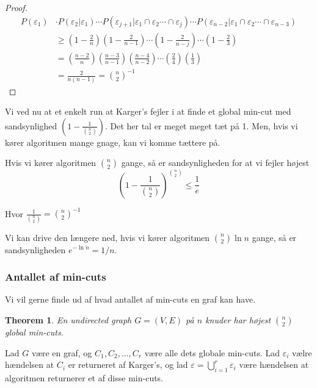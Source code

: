 \documentclass[11pt]{article}
\newtheorem{theorem}{Theorem}
\theoremstyle{definition}
\theoremstyle{remark}
\begin{document}
\begin{proof}
\begin{equation}
\begin{split}
  P(\varepsilon_{1}) &\cdot P(\varepsilon_{2}|\varepsilon_{1}) \cdots P(\varepsilon_{j+1}| \varepsilon_{1} \cap \varepsilon_{2} \cdots \cap \varepsilon_{j}) \cdots P(\varepsilon_{n-2}| \varepsilon_{1} \cap \varepsilon_{2} \cdots \cap \varepsilon_{n-3})\\
           &\geq \left( 1-\frac{2}{n} \right) \left( 1- \frac{2}{n-1} \right)\cdots \left( 1- \frac{2}{n-j} \right) \cdots \left( 1- \frac{2}{3}\right)\\
           &= \left( \frac{n-2}{n} \right) \left( \frac{n-3}{n-1} \right) \left( \frac{n-4}{n-2} \right) \cdots \left( \frac{2}{4} \right) \left( \frac{1}{3} \right)\\
  &= \frac{2}{n(n-1)} = \binom{n}{2}^{-1}
\end{split}
\end{equation}
\end{proof}

Vi ved nu at et enkelt run at Karger's fejler i at finde et global min-cut med sandsynlighed $( 1 - \frac{1}{\binom{n}{2}})$. Det her tal er meget meget tæt på 1. Men, hvis vi kører algoritmen mange gnage, kan vi komme tættere på.

Hvis vi kører algoritmen $\binom{n}{2}$ gange, så er sandsynligheden for at vi fejler højest
\[
\left(1- \frac{1}{\binom{n}{2}}  \right)^{\binom{n}{2}} \leq \frac{1}{e}
\]

Hvor $\frac{1}{\binom{n}{2}} = \binom{n}{2}^{-1}$

Vi kan drive den længere ned, hvis vi kører algoritmen $\binom{n}{2} \ln n$ gange, så er sandsynligheden $e^{- \ln n} = 1/n$.

\subsubsection{Antallet af min-cuts}

Vi vil gerne finde ud af hvad antallet af min-cuts en graf kan have.

\begin{theorem}
En undirected graph $G = (V,E)$ på $n$ knuder har højest $\binom{n}{2}$ global min-cuts. 
\end{theorem}

Lad $G$ være en graf, og $C_{1}, C_{2}, \ldots, C_{r}$ være alle dets globale min-cuts. Lad $\varepsilon_{i}$ vælre hændelsen at $C_{i}$ er returneret af Karger's, og lad $\varepsilon = \bigcup\limits_{i=1}^{r} \varepsilon_{i}$ være hændelsen at algoritmen returnerer et af disse min-cuts.
\end{document}
